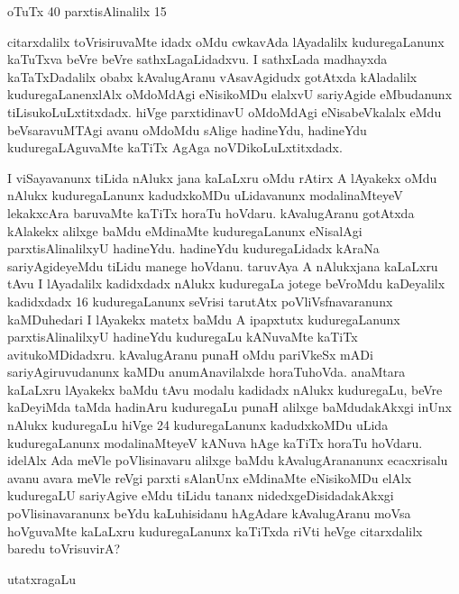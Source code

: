\begin{enumerate}[\rm 1]
\begin{center}
oTuTx {\rm 40} parxtisAlinalilx {\rm 15} 
\end{center}

citarxdalilx toVrisiruvaMte idadx oMdu cwkavAda lAyadalilx kuduregaLanunx kaTuTxva beVre beVre sathxLagaLidadxvu. I sathxLada madhayxda kaTaTxDadalilx obabx kAvalugAranu vAsavAgidudx gotAtxda kAladalilx kuduregaLanenxlAlx oMdoMdAgi eNisikoMDu elalxvU sariyAgide eMbudanunx tiLisukoLuLxtitxdadx. hiVge parxtidinavU oMdoMdAgi eNisabeVkalalx eMdu beVsaravuMTAgi avanu oMdoMdu sAlige hadineYdu, hadineYdu kuduregaLAguvaMte kaTiTx AgAga noVDikoLuLxtitxdadx.

I viSayavanunx tiLida nAlukx jana kaLaLxru oMdu rAtirx A lAyakekx oMdu nAlukx kuduregaLanunx kadudxkoMDu uLidavanunx modalinaMteyeV lekakxcAra baruvaMte kaTiTx horaTu hoVdaru. kAvalugAranu gotAtxda kAlakekx alilxge baMdu eMdinaMte kuduregaLanunx eNisalAgi parxtisAlinalilxyU hadineYdu. hadineYdu kuduregaLidadx kAraNa sariyAgideyeMdu tiLidu manege hoVdanu. taruvAya A nAlukxjana kaLaLxru tAvu I lAyadalilx kadidxdadx nAlukx kuduregaLa jotege beVroMdu kaDeyalilx kadidxdadx {\rm 16} kuduregaLanunx seVrisi tarutAtx poVliVsfnavaranunx kaMDuhedari I lAyakekx matetx baMdu A ipapxtutx kuduregaLanunx parxtisAlinalilxyU hadineYdu kuduregaLu kANuvaMte kaTiTx avitukoMDidadxru. kAvalugAranu punaH oMdu pariVkeSx mADi sariyAgiruvudanunx kaMDu anumAnavilalxde horaTuhoVda. anaMtara kaLaLxru lAyakekx baMdu tAvu modalu kadidadx nAlukx kuduregaLu, beVre kaDeyiMda taMda hadinAru kuduregaLu punaH alilxge baMdudakAkxgi inUnx nAlukx kuduregaLu hiVge {\rm 24} kuduregaLanunx kadudxkoMDu uLida kuduregaLanunx modalinaMteyeV kANuva hAge kaTiTx horaTu hoVdaru. idelAlx Ada meVle poVlisinavaru alilxge baMdu kAvalugArananunx ecacxrisalu avanu avara meVle reVgi parxti sAlanUnx eMdinaMte eNisikoMDu elAlx kuduregaLU sariyAgive eMdu tiLidu tananx nidedxgeDisidadakAkxgi poVlisinavaranunx beYdu kaLuhisidanu hAgAdare kAvalugAranu moVsa hoVguvaMte kaLaLxru kuduregaLanunx kaTiTxda riVti heVge citarxdalilx baredu toVrisuvirA?
\begin{center}
utatxragaLu


\end{center}
\end{enumerate}
